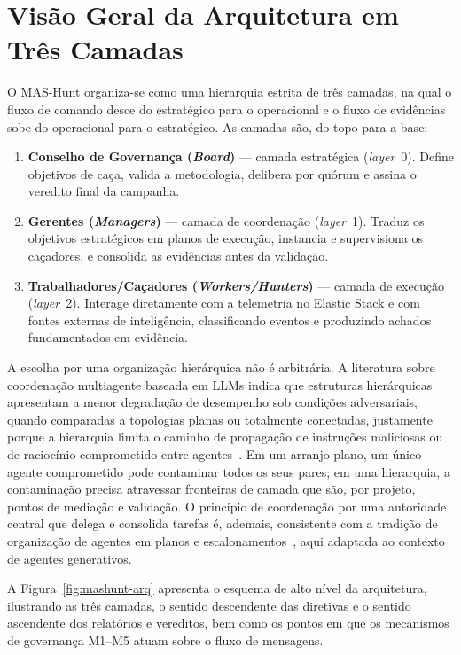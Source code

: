 \section{Visão Geral da Arquitetura em Três Camadas}
\label{sec:arq-visao-geral}

O MAS-Hunt organiza-se como uma hierarquia estrita de três camadas, na qual o
fluxo de comando desce do estratégico para o operacional e o fluxo de evidências
sobe do operacional para o estratégico. As camadas são, do topo para a base:

\begin{enumerate}
  \item \textbf{Conselho de Governança (\emph{Board})} --- camada estratégica
        (\emph{layer}~0). Define objetivos de caça, valida a metodologia,
        delibera por quórum e assina o veredito final da campanha.
  \item \textbf{Gerentes (\emph{Managers})} --- camada de coordenação
        (\emph{layer}~1). Traduz os objetivos estratégicos em planos de execução,
        instancia e supervisiona os caçadores, e consolida as evidências antes da
        validação.
  \item \textbf{Trabalhadores/Caçadores (\emph{Workers/Hunters})} --- camada de
        execução (\emph{layer}~2). Interage diretamente com a telemetria no
        Elastic Stack e com fontes externas de inteligência, classificando
        eventos e produzindo achados fundamentados em evidência.
\end{enumerate}

A escolha por uma organização hierárquica não é arbitrária. A literatura sobre
coordenação multiagente baseada em LLMs indica que estruturas hierárquicas
apresentam a menor degradação de desempenho sob condições adversariais, quando
comparadas a topologias planas ou totalmente conectadas, justamente porque a
hierarquia limita o caminho de propagação de instruções maliciosas ou de
raciocínio comprometido entre
agentes~\cite{liu2023llm,agashe2023llmcoordination}. Em um arranjo plano, um
único agente comprometido pode contaminar todos os seus pares; em uma hierarquia,
a contaminação precisa atravessar fronteiras de camada que são, por projeto,
pontos de mediação e validação. O princípio de coordenação por uma autoridade
central que delega e consolida tarefas é, ademais, consistente com a tradição de
organização de agentes em planos e
escalonamentos~\cite{durfee1993organizations}, aqui adaptada ao contexto de
agentes generativos.

A Figura~\ref{fig:mashunt-arq} apresenta o esquema de alto nível da arquitetura,
ilustrando as três camadas, o sentido descendente das diretivas e o sentido
ascendente dos relatórios e vereditos, bem como os pontos em que os mecanismos de
governança M1--M5 atuam sobre o fluxo de mensagens.

